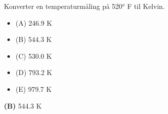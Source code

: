 

Konverter en temperaturmåling på 520$^{o}$ F til Kelvin.

\begin{itemize}
\item{(A)} 246.9 K
\vskip 5pt 
\item{(B)} 544.3 K
\vskip 5pt 
\item{(C)} 530.0 K
\vskip 5pt 
\item{(D)} 793.2 K
\vskip 5pt 
\item{(E)} 979.7 K
\end{itemize}







{\bf (B)} 544.3 K
 









